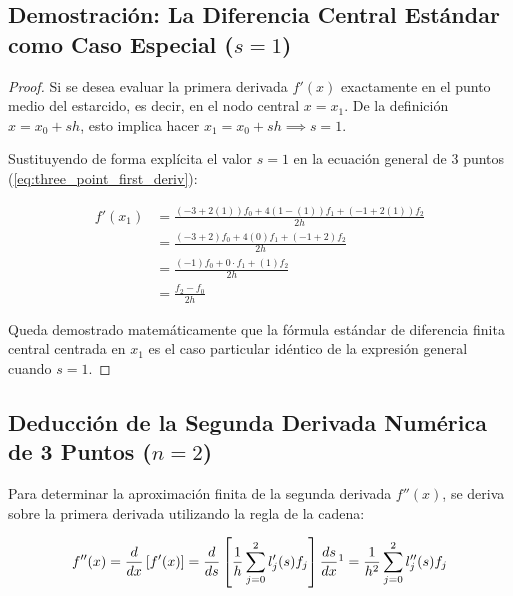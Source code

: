 \documentclass[11pt, a4paper]{article}
\begin{document}
	\subsection{Demostración: La Diferencia Central Estándar como Caso Especial ($s=1$)}
	
	\begin{proof}
		Si se desea evaluar la primera derivada $f'(x)$ exactamente en el punto medio del estarcido, es decir, en el nodo central $x = x_1$. De la definición $x = x_0 + s h$, esto implica hacer $x_1 = x_0 + s h \implies s = 1$.
		
		Sustituyendo de forma explícita el valor $s = 1$ en la ecuación general de 3 puntos (\ref{eq:three_point_first_deriv}):
		
		\begin{align}
			f'(x_1) &= \frac{(-3 + 2(1)) f_0 + 4(1 - (1)) f_1 + (-1 + 2(1)) f_2}{2h} \nonumber \\			
			&= \frac{(-3 + 2) f_0 + 4(0) f_1 + (-1 + 2) f_2}{2h} \nonumber \\
			&= \frac{(-1) f_0 + 0 \cdot f_1 + (1) f_2}{2h} \nonumber \\
			&= \frac{f_2 - f_0}{2h}
		\end{align}
		
		Queda demostrado matemáticamente que la fórmula estándar de diferencia finita central centrada en $x_1$ es el caso particular idéntico de la expresión general cuando $s=1$.
		
	\end{proof}
	
	\subsection{Deducción de la Segunda Derivada Numérica de 3 Puntos ($n=2$)}
	
	Para determinar la aproximación finita de la segunda derivada $f''(x)$, se deriva sobre la primera derivada utilizando la regla de la cadena:
	
	\begin{equation}
		f''(x) = \frac{d}{dx} \left[ f'(x) \right] = \frac{d}{ds} \left[ \frac{1}{h} \sum_{j=0}^{2} l_j'(s) f_j \right] \frac{ds}{dx} \footnotemark = \frac{1}{h^2} \sum_{j=0}^{2} l_j''(s) f_j
	\end{equation}
	
\end{document}
